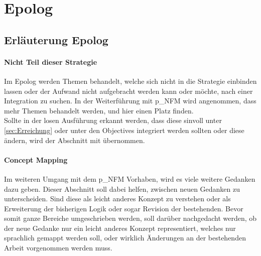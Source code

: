\section{Epolog}

\subsection{Erläuterung Epolog}
\paragraph{Nicht Teil dieser Strategie}
Im Epolog werden Themen behandelt, welche sich nicht in die Strategie einbinden lassen oder der Aufwand nicht aufgebracht werden kann oder möchte, nach einer Integration zu suchen. In der Weiterführung mit \gls{p_NFM} wird angenommen, dass mehr Themen behandelt werden, und hier einen Platz finden.\\

Sollte in der losen Ausführung erkannt werden, dass diese sinvoll unter \ref{sec:Erreichung} oder unter den Objectives integriert werden sollten oder diese ändern, wird der Abschnitt mit übernommen.

\paragraph{Concept Mapping}
Im weiteren Umgang mit dem \gls{p_NFM} Vorhaben, wird es viele weitere Gedanken dazu geben. Dieser Abschnitt soll dabei helfen, zwischen neuen Gedanken zu unterscheiden. Sind diese als leicht anderes Konzept zu verstehen oder als Erweiterung der bisherigen Logik oder sogar Revision der bestehenden. Bevor somit ganze Bereiche umgeschrieben werden, soll darüber nachgedacht werden, ob der neue Gedanke nur ein leicht anderes Konzept representiert, welches nur sprachlich gemappt werden soll, oder wirklich Änderungen an der bestehenden Arbeit vorgenommen werden muss.


